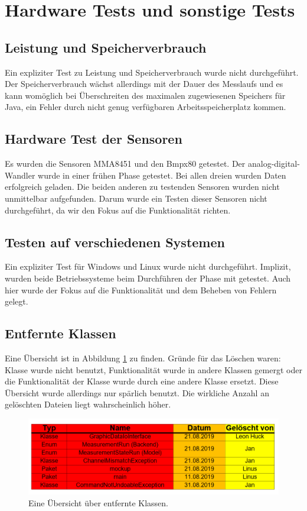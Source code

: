 \documentclass[parskip=full]{scrartcl}
\begin{document}
\clearpage
\section{Hardware Tests und sonstige Tests} \label{sonstiges}


\subsection{Leistung und Speicherverbrauch}
Ein expliziter Test zu Leistung und Speicherverbrauch wurde nicht durchgeführt. Der Speicherverbrauch wächst allerdings mit der Dauer des Messlaufs und es kann womöglich bei Überschreiten des maximalen zugewiesenen Speichers für Java, ein Fehler durch nicht genug verfügbaren Arbeitsspeicherplatz kommen.

\subsection{Hardware Test der Sensoren}
Es wurden die Sensoren MMA8451 und den Bmpx80 getestet. Der analog-digital-Wandler wurde in einer frühen Phase getestet.
Bei allen dreien wurden Daten erfolgreich geladen. Die beiden anderen zu testenden Sensoren wurden nicht unmittelbar aufgefunden. Darum wurde ein Testen dieser Sensoren nicht durchgeführt, da wir den Fokus auf die Funktionalität richten.

\subsection{Testen auf verschiedenen Systemen}

Ein expliziter Test für Windows und Linux wurde nicht durchgeführt. Implizit, wurden beide Betriebssysteme beim Durchführen der Phase mit getestet. Auch hier wurde der Fokus auf die Funktionalität und dem Beheben von Fehlern gelegt.

\subsection{Entfernte Klassen}
Eine Übersicht ist in Abbildung \ref{deletedFiles} zu finden. Gründe für das Löschen waren: Klasse wurde nicht benutzt, Funktionalität wurde in andere Klassen gemergt oder die Funktionalität der Klasse wurde durch eine andere Klasse ersetzt. Diese Übersicht wurde allerdings nur spärlich benutzt. Die wirkliche Anzahl an gelöschten Dateien liegt wahrscheinlich höher.

\begin{figure}[htbp]
	\begin{center}
		\includegraphics[width = 14cm]{Grafiken/deletedFiles.png}
		\caption{Eine Übersicht über entfernte Klassen.}
		\label{deletedFiles}
	\end{center}
\end{figure}
\end{document}
